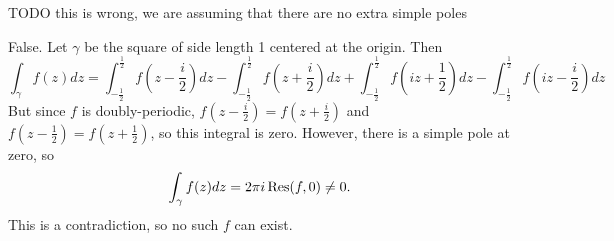 \documentclass{homework}
\begin{document}
                                                                                                                                        \begin{solution}
                                                                                                                                        TODO this is wrong, we are assuming that there are no extra simple poles

                                                                                                                                        False.  Let $\gamma$ be the square of side length 1 centered at the origin. Then 
                                                                                                                                        \[
                                                                                                                                        \int_\gamma f(z)dz = \int_{-\frac{1}{2}}^{\frac{1}{2}}f(z-\frac{i}{2})dz - \int_{-\frac{1}{2}}^{\frac{1}{2}}f(z+\frac{i}{2})dz + \int_{-\frac{1}{2}}^{\frac{1}{2}}f(iz+\frac{1}{2})dz - \int_{-\frac{1}{2}}^{\frac{1}{2}}f(iz-\frac{i}{2})dz
                                                                                                                                        \]
                                                                                                                                        But since $f$ is doubly-periodic, $f(z-\frac{i}{2}) = f(z+\frac{i}{2})$ and $f(z-\frac{1}{2}) = f(z+\frac{1}{2})$, so this integral is zero. However, there is a simple pole at zero, so 
                                                                                                                                        \[
                                                                                                                                        \int_\gamma f(z) dz = 2\pi i\operatorname{Res}(f, 0)\neq 0.
                                                                                                                                        \]
                                                                                                                                        This is a contradiction, so no such $f$ can exist.
                                                                                                                                        \end{solution}
\end{document}
